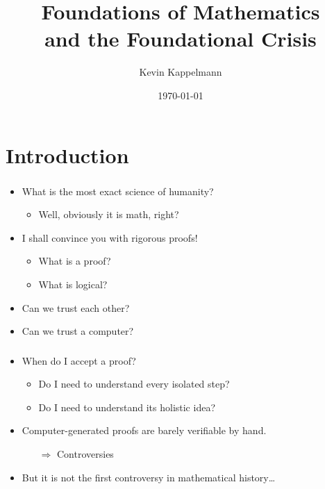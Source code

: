 \documentclass{beamer}
\title[Mathematical Foundations and Crises]{Foundations of Mathematics\\and the Foundational Crisis} %
\author{Kevin Kappelmann} %
\institute[TUM] %
{Technical University of Munich}
\date{\today} %
\begin{document}
\begin{frame}
\titlepage %
\end{frame}

\section*{Introduction}

\begin{frame}
    \frametitle{}
    \begin{itemize}[<+->]
	\item What is the most exact science of humanity?
	\begin{itemize}
		\item Well, obviously it is math, right?
	\end{itemize}
	\item I shall convince you with rigorous proofs!
	\begin{itemize}
		\item What is a proof?
		\item What is logical?
	\end{itemize}
	\item Can we trust each other?
	\item Can we trust a computer?
    \end{itemize}
\end{frame}

\begin{frame}
    \frametitle{}
    \begin{itemize}[<+->]
	\item When do I accept a proof?
	\begin{itemize}
		\item Do I need to understand every isolated step?
		\item Do I need to understand its holistic idea?
	\end{itemize}
	\item Computer-generated proofs are barely verifiable by hand.
	\begin{itemize}
		\item[$\Rightarrow$] Controversies
	\end{itemize}
	\item But it is not the first controversy in mathematical history\ldots
    \end{itemize}
\end{frame}
\end{document}
